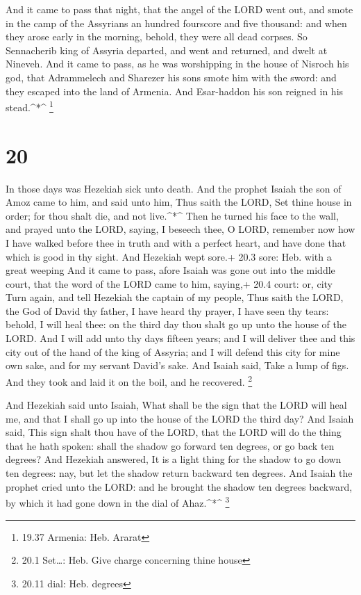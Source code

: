  And it came to pass that night, that the angel of the LORD
went out, and smote in the camp of the Assyrians an hundred fourscore
and five thousand: and when they arose early in the morning, behold,
they were all dead corpses.  So Sennacherib king of Assyria
departed, and went and returned, and dwelt at Nineveh.  And
it came to pass, as he was worshipping in the house of Nisroch his god,
that Adrammelech and Sharezer his sons smote him with the sword: and
they escaped into the land of Armenia. And Esar-haddon his son reigned
in his stead.\^{}*\^{} \footnote{19.37 Armenia: Heb. Ararat}

\hypertarget{section-19}{%
\section{20}\label{section-19}}

 In those days was Hezekiah sick unto death. And the prophet
Isaiah the son of Amoz came to him, and said unto him, Thus saith the
LORD, Set thine house in order; for thou shalt die, and not
live.\^{}*\^{}  Then he turned his face to the wall, and
prayed unto the LORD, saying,  I beseech thee, O LORD,
remember now how I have walked before thee in truth and with a perfect
heart, and have done that which is good in thy sight. And Hezekiah wept
sore.+ 20.3 sore: Heb. with a great weeping  And it came to
pass, afore Isaiah was gone out into the middle court, that the word of
the LORD came to him, saying,+ 20.4 court: or, city  Turn
again, and tell Hezekiah the captain of my people, Thus saith the LORD,
the God of David thy father, I have heard thy prayer, I have seen thy
tears: behold, I will heal thee: on the third day thou shalt go up unto
the house of the LORD.  And I will add unto thy days fifteen
years; and I will deliver thee and this city out of the hand of the king
of Assyria; and I will defend this city for mine own sake, and for my
servant David's sake.  And Isaiah said, Take a lump of figs.
And they took and laid it on the boil, and he recovered. \footnote{20.1
  Set\ldots: Heb. Give charge concerning thine house}

 And Hezekiah said unto Isaiah, What shall be the sign that
the LORD will heal me, and that I shall go up into the house of the LORD
the third day?  And Isaiah said, This sign shalt thou have
of the LORD, that the LORD will do the thing that he hath spoken: shall
the shadow go forward ten degrees, or go back ten degrees? 
And Hezekiah answered, It is a light thing for the shadow to go down ten
degrees: nay, but let the shadow return backward ten degrees.
 And Isaiah the prophet cried unto the LORD: and he brought
the shadow ten degrees backward, by which it had gone down in the dial
of Ahaz.\^{}*\^{} \footnote{20.11 dial: Heb. degrees}

